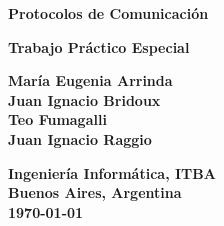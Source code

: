 \begin{titlepage}
  \begin{center}
    \vspace*{1cm}
    \textbf{Protocolos de Comunicación}

    \vspace{1cm}
    \Large\textbf{Trabajo Práctico Especial}

    \vspace{1cm}
    \large\textbf{María Eugenia Arrinda}\\
    \large\textbf{Juan Ignacio Bridoux}\\
    \large\textbf{Teo Fumagalli}\\
    \large\textbf{Juan Ignacio Raggio}\\

    \vfill

    \normalsize
    \textbf{Ingeniería Informática, ITBA}\\
    \textbf{Buenos Aires, Argentina}\\
    \textbf{\today}
    \vspace*{1cm}

  \end{center}
\end{titlepage}
